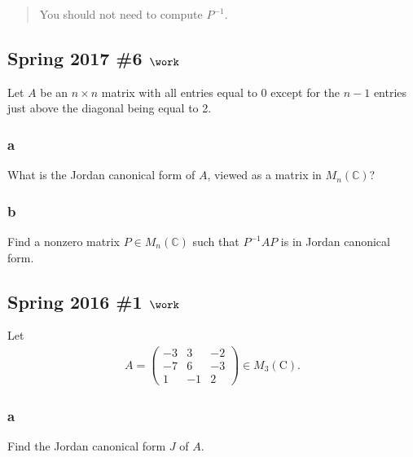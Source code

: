 \begin{quote}
You should not need to compute \(P^{-1}\).
\end{quote}

\hypertarget{spring-2017-6-work}{%
\subsection{\texorpdfstring{Spring 2017 \#6
\(\work\)}{Spring 2017 \#6 \textbackslash work}}\label{spring-2017-6-work}}

Let \(A\) be an \(n\times n\) matrix with all entries equal to \(0\)
except for the \(n-1\) entries just above the diagonal being equal to 2.

\hypertarget{a-113}{%
\subsubsection{a}\label{a-113}}

What is the Jordan canonical form of \(A\), viewed as a matrix in
\(M_n({\mathbb{C}})\)?

\hypertarget{b-103}{%
\subsubsection{b}\label{b-103}}

Find a nonzero matrix \(P\in M_n({\mathbb{C}})\) such that \(P^{-1}A P\)
is in Jordan canonical form.

\hypertarget{spring-2016-1-work}{%
\subsection{\texorpdfstring{Spring 2016 \#1
\(\work\)}{Spring 2016 \#1 \textbackslash work}}\label{spring-2016-1-work}}

Let
\begin{align*}
A=\left(\begin{array}{ccc}
-3 & 3 & -2 \\
-7 & 6 & -3 \\
1 & -1 & 2
\end{array}\right) \in M_{3}(\mathrm{C})
.\end{align*}

\hypertarget{a-114}{%
\subsubsection{a}\label{a-114}}

Find the Jordan canonical form \(J\) of \(A\).

